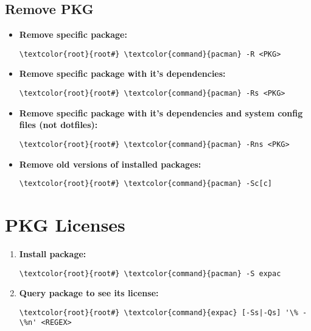 \documentclass[10pt, a4paper, onecolumn, openany]{book} %
\begin{document}
\subsection{Remove PKG}
\begin{itemize}
    \item \textbf{Remove specific package:}
\begin{Verbatim}[commandchars=\\\{\}]
\textcolor{root}{root#} \textcolor{command}{pacman} -R <PKG>
\end{Verbatim}
    \item \textbf{Remove specific package with it's dependencies:}
\begin{Verbatim}[commandchars=\\\{\}]
\textcolor{root}{root#} \textcolor{command}{pacman} -Rs <PKG>
\end{Verbatim}
    \item \textbf{Remove specific package with it's dependencies and system config files (not dotfiles):}
\begin{Verbatim}[commandchars=\\\{\}]
\textcolor{root}{root#} \textcolor{command}{pacman} -Rns <PKG>
\end{Verbatim}
    \item \textbf{Remove old versions of installed packages:}
\begin{Verbatim}[commandchars=\\\{\}]
\textcolor{root}{root#} \textcolor{command}{pacman} -Sc[c]
\end{Verbatim}
\end{itemize}
\section{PKG Licenses}
\begin{enumerate}
    \item \textbf{Install package:}
\begin{Verbatim}[commandchars=\\\{\}]
\textcolor{root}{root#} \textcolor{command}{pacman} -S expac
\end{Verbatim}    
    \item \textbf{Query package to see its license:}
\begin{Verbatim}[commandchars=\\\{\}]
\textcolor{root}{root#} \textcolor{command}{expac} [-Ss|-Qs] '\% - \%n' <REGEX>
\end{Verbatim}       
\end{enumerate}
\end{document}
